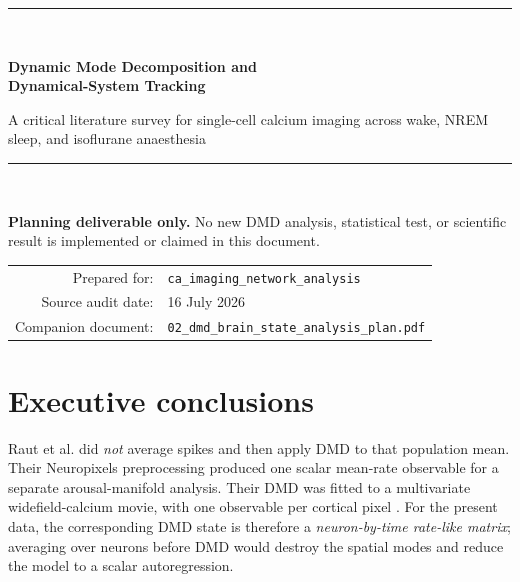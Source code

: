 \documentclass[11pt,a4paper]{article}
\begin{document}
\hypersetup{pageanchor=false}

\begin{titlepage}
  \centering
  \vspace*{2.0cm}
  {\color{navy}\rule{\textwidth}{1.2pt}}\\[1.1cm]
  {\Huge\bfseries Dynamic Mode Decomposition and\\[0.25em]
  Dynamical-System Tracking\par}
  \vspace{0.55cm}
  {\Large A critical literature survey for single-cell calcium imaging across wake, NREM sleep, and isoflurane anaesthesia\par}
  \vspace{1.0cm}
  {\color{navy}\rule{\textwidth}{0.6pt}}\\[1.0cm]
  \begin{tcolorbox}[colback=pale,colframe=teal,width=0.92\textwidth,arc=2pt]
  \centering
  \textbf{Planning deliverable only.} No new DMD analysis, statistical test, or scientific result is implemented or claimed in this document.
  \end{tcolorbox}
  \vfill
  \begin{tabular}{rl}
    Prepared for: & \texttt{ca\_imaging\_network\_analysis}\\
    Source audit date: & 16 July 2026\\
    Companion document: & \texttt{02\_dmd\_brain\_state\_analysis\_plan.pdf}
  \end{tabular}
  \vfill
\end{titlepage}

\hypersetup{pageanchor=true}
\tableofcontents
\clearpage
{}

\section{Executive conclusions}

\begin{keybox}
Raut et al. did \emph{not} average spikes and then apply DMD to that population mean. Their Neuropixels preprocessing produced one scalar mean-rate observable for a separate arousal-manifold analysis. Their DMD was fitted to a multivariate widefield-calcium movie, with one observable per cortical pixel \citep{raut2025}. For the present data, the corresponding DMD state is therefore a \emph{neuron-by-time rate-like matrix}; averaging over neurons before DMD would destroy the spatial modes and reduce the model to a scalar autoregression.
\end{keybox}
\end{document}
